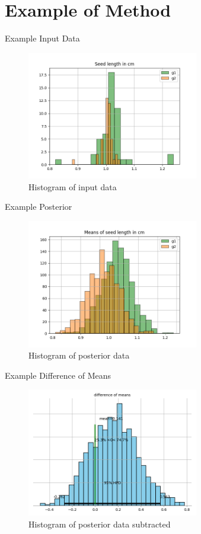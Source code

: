 \documentclass[t, aspectratio=169]{beamer}
\begin{document}
\section{Example of Method}
\label{sec:orgdbf6bd7}
\begin{frame}[label={sec:org5de2bc0}]{Example Input Data}
\begin{figure}[htbp]
\centering
\includegraphics[width=7.5cm]{exampledata.png}
\caption{\label{fig:orga0f27eb}
Histogram of input data}
\end{figure}
\end{frame}

\begin{frame}[label={sec:org51e811f}]{Example Posterior}
\begin{figure}[htbp]
\centering
\includegraphics[width=7.5cm]{examplebayes.png}
\caption{\label{fig:orgc2bd539}
Histogram of posterior data}
\end{figure}
\end{frame}

\begin{frame}[label={sec:orgc7e5336}]{Example Difference of Means}
\begin{figure}[htbp]
\centering
\includegraphics[width=7.5cm]{examplebayes2.png}
\caption{\label{fig:org91985a6}
Histogram of posterior data subtracted}
\end{figure}
\end{frame}
\end{document}
